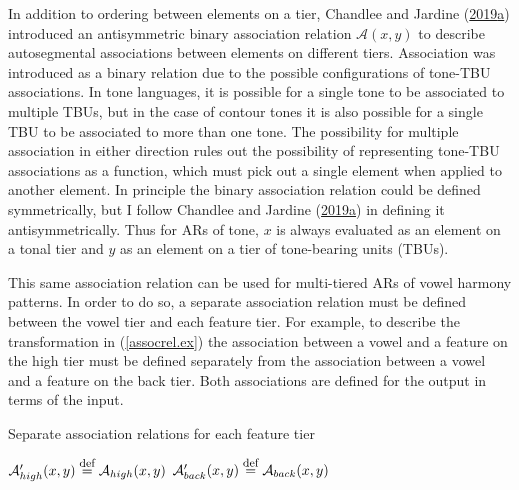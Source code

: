 \documentclass[,doc,floatsintext]{apa6}
\def\defeq{\mathrel{\buildrel \mbox{\footnotesize def} \over =}}
\theoremstyle{definition}
\theoremstyle{definition}
\theoremstyle{definition}
\theoremstyle{remark}
\begin{document}
In addition to ordering between elements on a tier, Chandlee and Jardine
(\protect\hyperlink{ref-chandleejardineaisl}{2019}\protect\hyperlink{ref-chandleejardineaisl}{a})
introduced an antisymmetric binary association relation
\(\mathcal{A}(x, y)\) to describe autosegmental associations between
elements on different tiers. Association was introduced as a binary
relation due to the possible configurations of tone-TBU associations. In
tone languages, it is possible for a single tone to be associated to
multiple TBUs, but in the case of contour tones it is also possible for
a single TBU to be associated to more than one tone. The possibility for
multiple association in either direction rules out the possibility of
representing tone-TBU associations as a function, which must pick out a
single element when applied to another element. In principle the binary
association relation could be defined symmetrically, but I follow
Chandlee and Jardine
(\protect\hyperlink{ref-chandleejardineaisl}{2019}\protect\hyperlink{ref-chandleejardineaisl}{a})
in defining it antisymmetrically. Thus for ARs of tone, \(x\) is always
evaluated as an element on a tonal tier and \(y\) as an element on a
tier of tone-bearing units (TBUs).

This same association relation can be used for multi-tiered ARs of vowel
harmony patterns. In order to do so, a separate association relation
must be defined between the vowel tier and each feature tier. For
example, to describe the transformation in (\ref{assocrel.ex}) the
association between a vowel and a feature on the high tier must be
defined separately from the association between a vowel and a feature on
the back tier. Both associations are defined for the output in terms of
the input.

\begin{exe}
\ex Separate association relations for each feature tier\label{assocrel.ex}\\
\begin{multicols}{2}

\columnbreak
\begin{xlist}
  \ex $\mathcal{A}_{high}'(x, y) \defeq \mathcal{A}_{high}(x, y)$
  \ex $\mathcal{A}_{back}'(x, y) \defeq \mathcal{A}_{back}(x, y)$
\end{xlist}
\end{multicols}
\end{exe}
\end{document}

